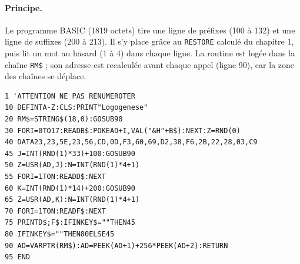 \documentclass[a4paper,10pt]{article}
\begin{document}
\paragraph{Principe.} Le programme BASIC (1819 octets) tire une ligne de
préfixes (100 à 132) et une ligne de suffixes (200 à 213). Il s'y place grâce
au \texttt{RESTORE} calculé du chapitre 1, puis lit un mot au hasard (1 à 4)
dans chaque ligne. La routine est logée dans la chaîne \texttt{RM\$} ; son
adresse est recalculée avant chaque appel (ligne 90), car la zone des
chaînes se déplace.
\begin{verbatim}
1 'ATTENTION NE PAS RENUMEROTER
10 DEFINTA-Z:CLS:PRINT"Logogenese"
20 RM$=STRING$(18,0):GOSUB90
30 FORI=0TO17:READB$:POKEAD+I,VAL("&H"+B$):NEXT:Z=RND(0)
40 DATA23,23,5E,23,56,CD,0D,F3,60,69,D2,38,F6,2B,22,28,03,C9
45 J=INT(RND(1)*33)+100:GOSUB90
50 Z=USR(AD,J):N=INT(RND(1)*4+1)
55 FORI=1TON:READD$:NEXT
60 K=INT(RND(1)*14)+200:GOSUB90
65 Z=USR(AD,K):N=INT(RND(1)*4+1)
70 FORI=1TON:READF$:NEXT
75 PRINTD$;F$:IFINKEY$=""THEN45
80 IFINKEY$=""THEN80ELSE45
90 AD=VARPTR(RM$):AD=PEEK(AD+1)+256*PEEK(AD+2):RETURN
95 END
\end{verbatim}
\end{document}
